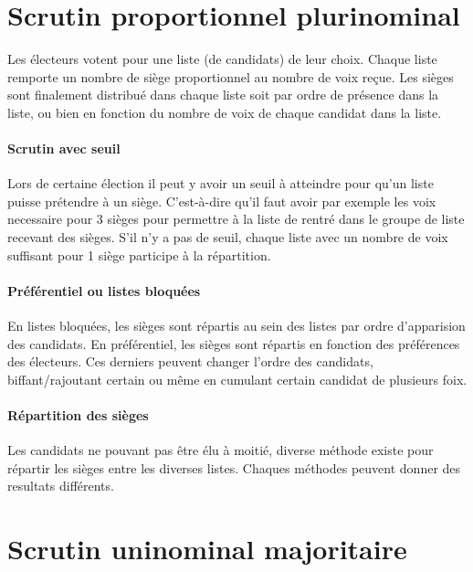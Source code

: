 \documentclass[../report]{subfiles}
\begin{document}
  \section{Scrutin proportionnel plurinominal}

  Les électeurs votent pour une liste (de candidats) de leur choix.
  Chaque liste remporte un nombre de siège proportionnel au nombre de voix reçue.
  Les sièges sont finalement distribué dans chaque liste soit par ordre de présence dans
  la liste, ou bien en fonction du nombre de voix de chaque candidat dans la liste.

  \paragraph{Scrutin avec seuil}

  Lors de certaine élection il peut y avoir un seuil à atteindre pour qu'un liste puisse 
  prétendre à un siège.
  C'est-à-dire qu'il faut avoir par exemple les voix necessaire pour 3 sièges pour permettre
  à la liste de rentré dans le groupe de liste recevant des sièges.
  S'il n'y a pas de seuil, chaque liste avec un nombre de voix suffisant pour 1 siège participe 
  à la répartition.
  
  \paragraph{Préférentiel ou listes bloquées}

  En listes bloquées, les sièges sont répartis au sein des listes par ordre d'apparision 
  des candidats.
  En préférentiel, les sièges sont répartis en fonction des préférences des électeurs.
  Ces derniers peuvent changer l'ordre des candidats, biffant/rajoutant certain ou même
  en cumulant certain candidat de plusieurs foix.
  
  \paragraph{Répartition des sièges}

  Les candidats ne pouvant pas être élu à moitié, diverse méthode existe pour répartir
  les sièges entre les diverses listes.
  Chaques méthodes peuvent donner des resultats différents.
  
  \section{Scrutin uninominal majoritaire}\label{diff:scrutin-majoritaire}
  
\end{document}
